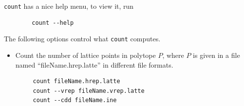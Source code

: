 \documentclass{article}
\begin{document}
{\tt count} has a nice help menu, to view it, run

\begin{verbatim}
        count --help
\end{verbatim}


The following options control what {\tt count} computes.

\begin{itemize}
\item Count the number of lattice points in polytope $P$, where $P$  is given in a file named ``fileName.hrep.latte'' in different file formats.
        \begin{verbatim}
     count fileName.hrep.latte
     count --vrep fileName.vrep.latte
     count --cdd fileName.ine
        \end{verbatim} 


\end{itemize}
\end{document}
